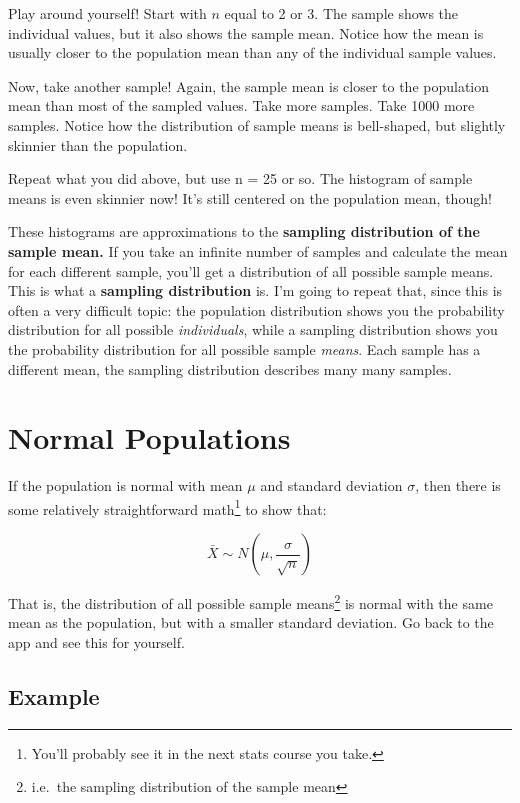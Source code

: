 \documentclass[
  letterpaper,
  DIV=11,
  numbers=noendperiod]{scrreprt}
\begin{document}
Play around yourself! Start with \(n\) equal to 2 or 3. The sample shows
the individual values, but it also shows the sample mean. Notice how the
mean is usually closer to the population mean than any of the individual
sample values.

Now, take another sample! Again, the sample mean is closer to the
population mean than most of the sampled values. Take more samples. Take
1000 more samples. Notice how the distribution of sample means is
bell-shaped, but slightly skinnier than the population.

Repeat what you did above, but use n = 25 or so. The histogram of sample
means is even skinnier now! It's still centered on the population mean,
though!

These histograms are approximations to the \textbf{sampling distribution
of the sample mean.} If you take an infinite number of samples and
calculate the mean for each different sample, you'll get a distribution
of all possible sample means. This is what a \textbf{sampling
distribution} is. I'm going to repeat that, since this is often a very
difficult topic: the population distribution shows you the probability
distribution for all possible \emph{individuals}, while a sampling
distribution shows you the probability distribution for all possible
sample \emph{means}. Each sample has a different mean, the sampling
distribution describes many many samples.

\hypertarget{normal-populations}{%
\chapter{Normal Populations}\label{normal-populations}}

If the population is normal with mean \(\mu\) and standard deviation
\(\sigma\), then there is some relatively straightforward
math\footnote{You'll probably see it in the next stats course you take.}
to show that:

\[
\bar X \sim N\left(\mu, \frac{\sigma}{\sqrt{n}}\right)
\]

That is, the distribution of all possible sample means\footnote{i.e.~the
  sampling distribution of the sample mean} is normal with the same mean
as the population, but with a smaller standard deviation. Go back to the
app and see this for yourself.

\hypertarget{example-1}{%
\section{Example}\label{example-1}}
\end{document}
